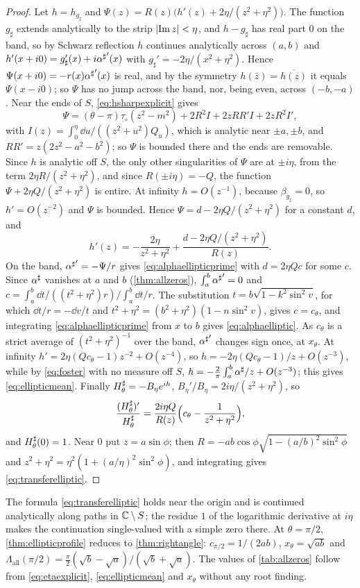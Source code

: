 \begin{proof}
Let $h=h_{g_\sharp}$ and $\Psi(z)=R(z)\big(h'(z)+2\eta/(z^2+\eta^2)\big)$. The
function $g_\sharp$ extends analytically to the strip $\left|\operatorname{Im} z\right|<\eta$, and
$h-g_\sharp$ has real part $0$ on the band, so by Schwarz reflection $h$
continues analytically across $(a,b)$ and $h'(x+i0)=g_\sharp'(x)+i{\alpha^{\sharp}}'(x)$
with $g_\sharp'=-2\eta/(x^2+\eta^2)$. Hence $\Psi(x+i0)=-r(x){\alpha^{\sharp}}'(x)$ is real,
and by the symmetry $h(\bar z)=\overline{h(z)}$ it equals $\Psi(x-i0)$; so
$\Psi$ has no jump across the band, nor, being even, across $(-b,-a)$. Near
the ends of $S$, \eqref{eq:hsharpexplicit} gives
\[
\Psi=(\theta-\pi)\tau_\circ(z^2-m^2)+2R^2I+2zRR'I+2zR^2I',
\]
with $I(z)=\int_0^\eta\dd u/((z^2+u^2)Q_u)$, which is analytic near
$\pm a,\pm b$, and $RR'=z(2z^2-a^2-b^2)$; so $\Psi$ is bounded there and the
ends are removable. Since $h$ is analytic off $S$, the only other
singularities of $\Psi$ are at $\pm i\eta$, from the term $2\eta R/(z^2+\eta^2)$,
and since $R(\pm i\eta)=-Q$, the function $\Psi+2\eta Q/(z^2+\eta^2)$ is
entire. At infinity $h=O(z^{-1})$, because $\beta_{g_\sharp}=0$, so
$h'=O(z^{-2})$ and $\Psi$ is bounded. Hence $\Psi=d-2\eta Q/(z^2+\eta^2)$ for a constant $d$, and
\[
h'(z)=-\frac{2\eta}{z^2+\eta^2}+\frac{d-2\eta Q/(z^2+\eta^2)}{R(z)} .
\]
On the band, ${\alpha^{\sharp}}'=-\Psi/r$ gives \eqref{eq:alphaellipticprime} with $d=2\eta
Qc$ for some $c$. Since ${\alpha^{\sharp}}$ vanishes at $a$ and $b$ (\cref{thm:allzeros}),
$\int_a^b{\alpha^{\sharp}}'=0$ and $c=\int_a^b\dd t/((t^2+\eta^2)r)\big/\int_a^b\dd t/r$.
The substitution $t=b\sqrt{1-k^2\sin^2v}$, for which $\dd t/r=-\dd v/t$ and
$t^2+\eta^2=(b^2+\eta^2)(1-n\sin^2v)$, gives $c=c_\theta$, and integrating
\eqref{eq:alphaellipticprime} from $x$ to $b$ gives \eqref{eq:alphaelliptic}.
As $c_\theta$ is a strict average of $(t^2+\eta^2)^{-1}$ over the band,
${\alpha^{\sharp}}'$ changes sign once, at $x_\theta$. At infinity
$h'=2\eta(Qc_\theta-1)z^{-2}+O(z^{-4})$, so $h=-2\eta(Qc_\theta-1)/z+O(z^{-3})$,
while by \eqref{eq:foster} with no measure off $S$,
$h=-\frac2\pi\int_a^b{\alpha^{\sharp}}/z+O(z^{-3})$; this gives \eqref{eq:ellipticmean}.
Finally $H^{\sharp}_\theta=-B_\eta e^{ih}$, $B_\eta'/B_\eta=2i\eta/(z^2+\eta^2)$, so
\[
\frac{(H^{\sharp}_\theta)'}{H^{\sharp}_\theta}=\frac{2i\eta Q}{R(z)}\Big(c_\theta-\frac1{z^2+\eta^2}\Big),
\]
and $H^{\sharp}_\theta(0)=1$. Near $0$ put $z=a\sin\phi$; then
$R=-ab\cos\phi\sqrt{1-(a/b)^2\sin^2\phi}$ and
$z^2+\eta^2=\eta^2(1+(a/\eta)^2\sin^2\phi)$, and integrating gives
\eqref{eq:transferelliptic}.
\end{proof}

The formula \eqref{eq:transferelliptic} holds near the origin and is
continued analytically along paths in $\mathbb C\setminus S$; the residue $1$ of
the logarithmic derivative at $i\eta$ makes the continuation single-valued
with a simple zero there. At $\theta=\pi/2$, \cref{thm:ellipticprofile}
reduces to \cref{thm:rightangle}: $c_{\pi/2}=1/(2ab)$, $x_\theta=\sqrt{ab}$
and $\Lambda_{\mathrm{all}}(\pi/2)=\frac\pi2(\sqrt b-\sqrt a)/(\sqrt b+\sqrt a)$.
The values of \cref{tab:allzeros} follow from \eqref{eq:etaexplicit},
\eqref{eq:ellipticmean} and $x_\theta$ without any root finding.

